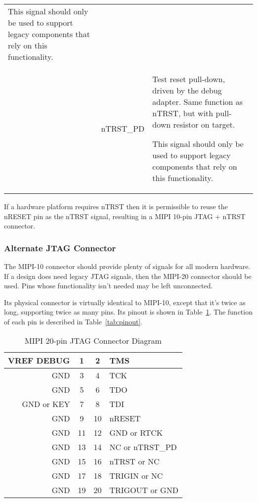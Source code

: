 \begin{table}[htp]
\begin{tabulary}{\textwidth}{|l|c|L|}
        This signal should only be used to support legacy components that rely
        on this functionality.
        \\
      & nTRST\_PD & Test reset pull-down, driven by the debug
        adapter. Same function as nTRST, but with pull-down resistor on target.

        This signal should only be used to support legacy components that rely
        on this functionality.
        \\
      \hline
    \end{tabulary}
\end{table}

If a hardware platform requires nTRST then it is permissible to reuse the nRESET pin as
the nTRST signal, resulting in a MIPI 10-pin JTAG + nTRST connector.

\subsubsection{Alternate JTAG Connector}

The MIPI-10 connector should provide plenty of signals for all modern hardware.
If a design does need legacy JTAG signals, then the
MIPI-20 connector should be used. Pins whose functionality isn't needed may be
left unconnected.

Its physical connector is virtually identical
to MIPI-10, except that it's twice as long, supporting twice as many pins. Its
pinout is shown in Table~\ref{tab:mipitwenty}. The function of each pin
is described in Table~\ref{tab:pinout}.

\begin{table}[H]
    \centering
    \caption{MIPI 20-pin JTAG Connector Diagram}
    \label{tab:mipitwenty}
    \begin{tabular}{|r|c|c|l|}
        \hline
        VREF DEBUG & 1 & 2 & TMS \\
        \hline
        GND & 3 & 4 & TCK \\
        \hline
        GND & 5 & 6 & TDO \\
        \hline
        GND or KEY & 7 & 8 & TDI \\
        \hline
        GND & 9 & 10 & nRESET \\
        \hline
        GND & 11 & 12 & GND or RTCK \\
        \hline
        GND & 13 & 14 & NC or nTRST\_PD \\
        \hline
        GND & 15 & 16 & nTRST or NC \\
        \hline
        GND & 17 & 18 & TRIGIN or NC \\
        \hline
        GND & 19 & 20 & TRIGOUT or GND \\
        \hline
    \end{tabular}
\end{table}

